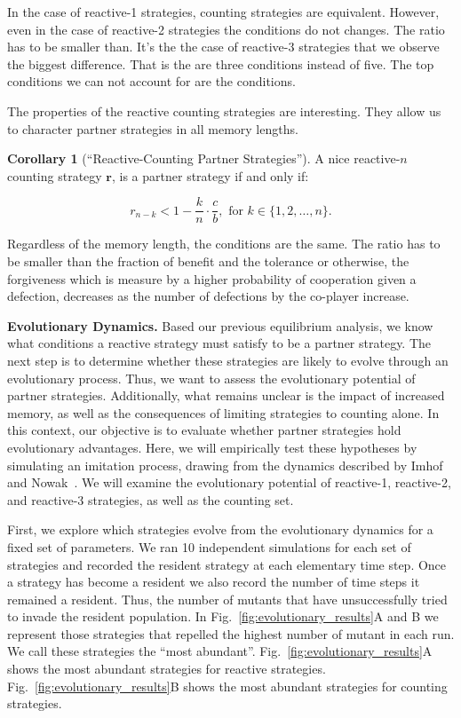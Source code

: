 \documentclass{article}
\theoremstyle{definition}
\newtheorem{corollary}{Corollary}[theorem]
\begin{document}
In the case of reactive-1 strategies, counting strategies are equivalent.
However, even in the case of reactive-2 strategies the conditions do not
changes. The ratio has to be smaller than. It's the the case of reactive-3
strategies that we observe the biggest difference. That is the are three
conditions instead of five. The top conditions we can not account for are the
conditions.

The properties of the reactive counting strategies are interesting. They allow
us to character partner strategies in all memory lengths.

\begin{corollary}[``Reactive-Counting Partner Strategies'']\label{corollary:reactive_counting_partner_strategies}
A nice reactive-$n$ counting strategy $\mathbf{r}$,
is a partner strategy if and only if:

\begin{equation}
  r_{n - k} < 1 - \frac{k}{n} \cdot \frac{c}{b}, \text{ for } k \in \{1, 2, \dots, n\}.
\end{equation}
\end{corollary}

Regardless of the memory length, the conditions are the same. The ratio has to
be smaller than the fraction of benefit and the tolerance or otherwise, the
forgiveness which is measure by a higher probability of cooperation given a
defection, decreases as the number of defections by the co-player increase.


\textbf{Evolutionary Dynamics.}
Based our previous equilibrium analysis, we know what conditions a reactive
strategy must satisfy to be a partner strategy. The next step is to determine
whether these strategies are likely to evolve through an evolutionary process.
Thus, we want to assess the evolutionary potential of partner strategies.
Additionally, what remains unclear is the impact of increased memory, as well as
the consequences of limiting strategies to counting alone. In this context, our
objective is to evaluate whether partner strategies hold evolutionary
advantages.
Here, we will empirically test these hypotheses by simulating an imitation
process, drawing from the dynamics described by Imhof and
Nowak~\cite{imhof:royal:2010}. We will examine the evolutionary potential of
reactive-1, reactive-2, and reactive-3 strategies, as well as the counting set.

First, we explore which strategies evolve from the evolutionary dynamics for a
fixed set of parameters. We ran 10 independent simulations for each set of
strategies and recorded the resident strategy at each elementary time step. Once
a strategy has become a resident we also record the number of time steps it
remained a resident. Thus, the number of mutants that have unsuccessfully tried
to invade the resident population. In Fig.~\ref{fig:evolutionary_results}A and B
we represent those strategies that repelled the highest number of mutant in each
run. We call these strategies the ``most abundant''.
Fig.~\ref{fig:evolutionary_results}A shows the most abundant strategies for
reactive strategies.
Fig.~\ref{fig:evolutionary_results}B shows the most abundant strategies for
counting strategies.
\end{document}
